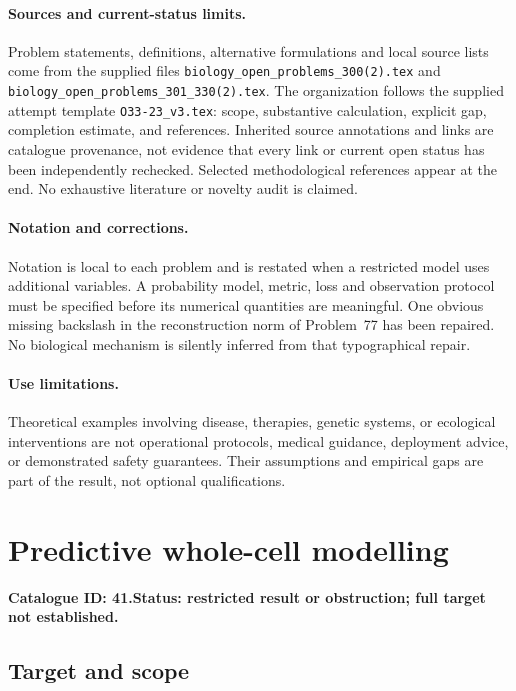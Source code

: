 \documentclass[11pt]{article}
\begin{document}
\paragraph{Sources and current-status limits.}
Problem statements, definitions, alternative formulations and local source lists
come from the supplied files
\texttt{biology\_open\_problems\_300(2).tex} and
\texttt{biology\_open\_problems\_301\_330(2).tex}.
The organization follows the supplied attempt template
\texttt{O33-23\_v3.tex}: scope, substantive calculation, explicit gap,
completion estimate, and references. Inherited source annotations and links are
catalogue provenance, not evidence that every link or current open status has
been independently rechecked. Selected methodological references appear at the
end. No exhaustive literature or novelty audit is claimed.

\paragraph{Notation and corrections.}
Notation is local to each problem and is restated when a restricted model uses
additional variables. A probability model, metric, loss and observation protocol
must be specified before its numerical quantities are meaningful. One obvious
missing backslash in the reconstruction norm of Problem~77 has been repaired.
No biological mechanism is silently inferred from that typographical repair.

\paragraph{Use limitations.}
Theoretical examples involving disease, therapies, genetic systems, or ecological
interventions are not operational protocols, medical guidance, deployment advice,
or demonstrated safety guarantees. Their assumptions and empirical gaps are part
of the result, not optional qualifications.

\setcounter{section}{40}
\section{Predictive whole-cell modelling}
\label{prob:041}
\noindent\textbf{Catalogue ID: 41.}\quad \textbf{Status: restricted result or obstruction; full target not established.}
\subsection{Target and scope}
\end{document}
